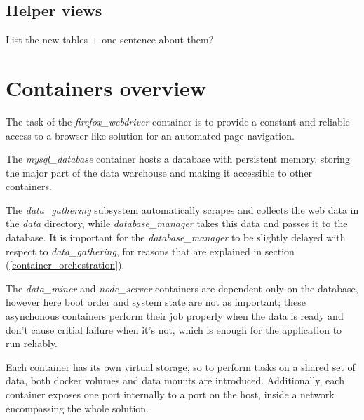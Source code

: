 \subsection{Helper views}
List the new tables + one sentence about them?

\section{Containers overview}
The task of the \textit{firefox\_webdriver} container is to provide a constant and reliable access to a browser-like solution for an automated page navigation.

The \textit{mysql\_database} container hosts a database with persistent memory, storing the major part of the data warehouse and making it accessible to other containers.

The \textit{data\_gathering} subsystem automatically scrapes and collects the web data in the \textit{data} directory, while \textit{database\_manager} takes this data and passes it to the database. It is important for the \textit{database\_manager} to be slightly delayed with respect to \textit{data\_gathering}, for reasons that are explained in section (\ref{container_orchestration}).

The \textit{data\_miner} and \textit{node\_server} containers are dependent only on the database, however here boot order and system state are not as important; these asynchonous containers perform their job properly when the data is ready and don't cause critial failure when it's not, which is enough for the application to run reliably.

Each container has its own virtual storage, so to perform tasks on a shared set of data, both docker volumes and data mounts are introduced. Additionally, each container exposes one port internally to a port on the host, inside a network encompassing the whole solution.

